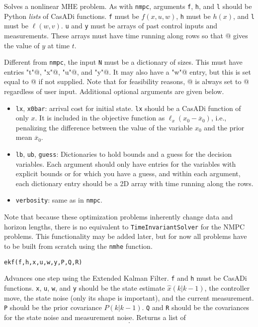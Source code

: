 \documentclass{article}
\newcommand{\funcname}[2][.25em]{\vspace{#1}\noindent\texttt{#2}\nopagebreak\vspace{#1}}
\newcommand{\casadi}{CasADi}
\begin{document}
\begin{multicols}{2}
Solves a nonlinear MHE problem.
As with \texttt{nmpc}, arguments \texttt{f}, \texttt{h}, and \texttt{l} should be Python \emph{lists} of \casadi{} functions.
\texttt{f} must be $f(x,u,w)$, \texttt{h} must be $h(x)$, and \texttt{l} must be $\ell(w,v)$.
\texttt{u} and \texttt{y} must be arrays of past control inputs and measurements.
These arrays must have time running along rows so that \lstinline@y[t,:]@ gives the value of $y$ at time $t$.

Different from \texttt{nmpc}, the input \texttt{N} must be a dictionary of sizes.
This must have entries \lstinline@"t"@, \lstinline@"x"@, \lstinline@"u"@, and \lstinline@"y"@.
It may also have a \lstinline@"w"@ entry, but this is set equal to \lstinline@N["x"]@ if not supplied.
Note that for feasibility reasons, \lstinline@N["v"]@ is always set to \lstinline@N["y"]@ regardless of user input. Additional optional arguments are given below.

\begin{itemize}[noitemsep,nolistsep]
    \item \texttt{lx}, \texttt{x0bar}: arrival cost for initial state.
    \texttt{lx} should be a \casadi{} function of only $x$.
    It is included in the objective function as $\ell_x(x_0 - \overline{x}_0)$, i.e., penalizing the difference between the value of the variable $x_0$ and the prior mean $\overline{x}_0$.
    \item \texttt{lb}, \texttt{ub}, \texttt{guess}: Dictionaries to hold bounds and a guess for the decision variables.
    Each argument should only have entries for the variables with explicit bounds or for which you have a guess, and within each argument, each dictionary entry should be a 2D array with time running along the rows.
    \item \texttt{verbosity}: same as in \texttt{nmpc}.
\end{itemize}

Note that because these optimization problems inherently change data and horizon lengths, there is no equivalent to \texttt{TimeInvariantSolver} for the NMPC problems.
This functionality may be added later, but for now all problems have to be built from scratch using the \texttt{nmhe} function.

\funcname{ekf(f,h,x,u,w,y,P,Q,R)}

Advances one step using the Extended Kalman Filter.
\texttt{f} and \texttt{h} must be \casadi{} functions.
\texttt{x}, \texttt{u}, \texttt{w}, and \texttt{y} should be the state estimate $\hat{x}(k|k-1)$, the controller move, the state noise (only its shape is important), and the current measurement.
\texttt{P} should be the prior covariance $P(k|k-1)$.
\texttt{Q} and \texttt{R} should be the covariances for the state noise and measurement noise.
Returns a list of
%
\begin{equation*}
    [P(k+1|k), \; \hat{x}(k+1|k), \; P(k|k), \; \hat{x}(k|k)].
\end{equation*}


\end{multicols}
\end{document}
